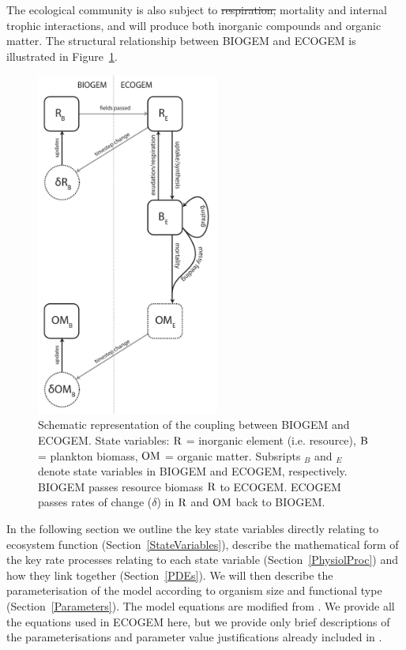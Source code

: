 \documentclass[gmd, manuscript]{copernicus}
\providecommand{\DIFdel}[1]{{\protect\color{red}\sout{#1}}}                      %
\providecommand{\DIFdelbegin}{} %
\providecommand{\DIFdelend}{} %
\begin{document}
The ecological community is also subject to \DIFdelbegin \DIFdel{respiration, }\DIFdelend mortality and internal trophic interactions, and will produce both inorganic compounds and organic matter. The structural relationship between BIOGEM and ECOGEM is illustrated in Figure~\ref{BIOECOGEM}. 

\begin{figure}[htp!]
\includegraphics[width=6cm]{Figures/CouplingSchematic.pdf}
\caption{Schematic representation of the coupling between BIOGEM and ECOGEM. State variables: $\rm{R}$ = inorganic element (i.e. resource),  $\rm{B}$ = plankton biomass, $\rm{OM}$ = organic matter. Subsripts $_B$ and $_E$ denote state variables in BIOGEM and ECOGEM, respectively. BIOGEM passes resource biomass $\rm{R}$ to ECOGEM. ECOGEM passes rates of change ($\delta$) in  $\rm{R}$ and $\rm{OM}$ back to BIOGEM.}
\label{BIOECOGEM}
\end{figure}

In the following section we outline the key state variables directly relating to ecosystem function (Section~\ref{StateVariables}), describe the mathematical form of the key rate processes relating to each state variable (Section~\ref{PhysiolProc}) and how they link together (Section~\ref{PDEs}). We will then describe the parameterisation of the model according to organism size and functional type (Section~\ref{Parameters}). The model equations are modified from \citet{Ward:2012}. We provide all the equations used in ECOGEM here, but we provide only brief descriptions of the parameterisations and parameter value justifications already included in \citet{Ward:2012}.
\end{document}
